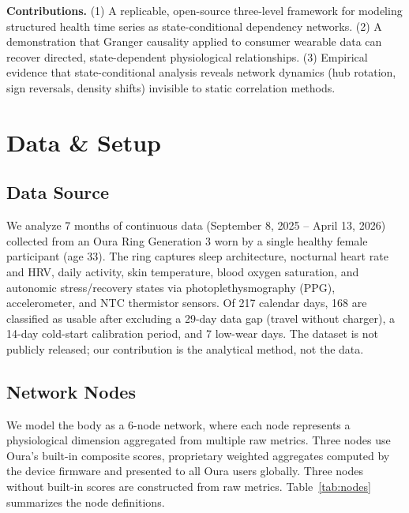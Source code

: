 \documentclass[letterpaper]{article}
\begin{document}
\textbf{Contributions.} (1) A replicable, open-source three-level framework for modeling structured health time series as state-conditional dependency networks. (2) A demonstration that Granger causality applied to consumer wearable data can recover directed, state-dependent physiological relationships. (3) Empirical evidence that state-conditional analysis reveals network dynamics (hub rotation, sign reversals, density shifts) invisible to static correlation methods.

\section{Data \& Setup}

\subsection{Data Source}

We analyze 7 months of continuous data (September 8, 2025 -- April 13, 2026) collected from an Oura Ring Generation 3 worn by a single healthy female participant (age 33). The ring captures sleep architecture, nocturnal heart rate and HRV, daily activity, skin temperature, blood oxygen saturation, and autonomic stress/recovery states via photoplethysmography (PPG), accelerometer, and NTC thermistor sensors. Of 217 calendar days, 168 are classified as usable after excluding a 29-day data gap (travel without charger), a 14-day cold-start calibration period, and 7 low-wear days. The dataset is not publicly released; our contribution is the analytical method, not the data.

\subsection{Network Nodes}

We model the body as a 6-node network, where each node represents a physiological dimension aggregated from multiple raw metrics. Three nodes use Oura's built-in composite scores, proprietary weighted aggregates computed by the device firmware and presented to all Oura users globally. Three nodes without built-in scores are constructed from raw metrics. Table~\ref{tab:nodes} summarizes the node definitions.
\end{document}
